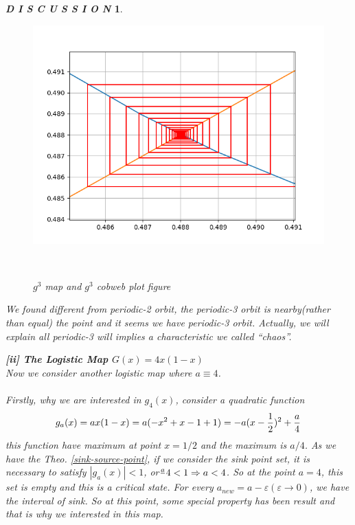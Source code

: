 \documentclass[12pt]{article}
\theoremstyle{plain}
\newtheorem{discussion}{\textit{D I S C U S S I O N}}[section]
\begin{document}
\begin{discussion}
\begin{figure}[H]
\begin{minipage}[c][0.33\width]{0.33\textwidth}
\end{minipage}
\begin{minipage}[c][0.33\width]{0.33\textwidth}
   \centering
   \includegraphics[width=\textwidth]{figure/section1/g3logistic384-001-detail.png} 
\end{minipage}
\\[3ex]\caption{$g^3$ map and $g^3$ cobweb plot figure}\label{logistic-cobweb-plot1}
\end{figure}

We found different from periodic-2 orbit, the periodic-3 orbit is nearby(rather than equal) the point and it seems we have periodic-3 orbit. Actually, we will explain all periodic-3 will implies a characteristic we called ``chaos''. 






\newpage
  \noindent \textbf{[ii] The Logistic Map $G(x) = 4x(1-x)$}
\\\noindent Now we consider another logistic map where $a \equiv 4$. \\[1ex]
\\\noindent Firstly, why we are interested in $g_4(x)$, consider a quadratic function 
$$
g_a(x) = ax(1-x) = a(-x^2 + x - 1 + 1) = -a(x-{1\over 2})^2 +{a\over 4}
$$
this function have maximum at point $x = 1/2$ and the maximum is $a/4$. As we have the Theo. \ref{sink-source-point}, if we consider the sink point set, it is necessary to satisfy $|g_a(x)| < 1$, or${a \over } 4 < 1 \Rightarrow a < 4$. So at the point $a = 4$, this set is empty and this is a critical state. For every $a_{new} = a - \varepsilon (\varepsilon \rightarrow 0)$, we have the interval of sink. So at this point, some special property has been result and that is why we interested in this map.


\end{discussion}
\end{document}
